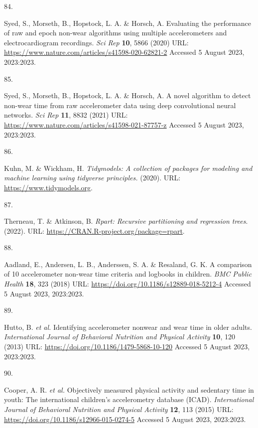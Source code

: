 \documentclass[
  9pt,
]{scrbook}
\newlength{\cslhangindent}
\newlength{\csllabelwidth}
\newlength{\cslentryspacingunit} %
\newenvironment{CSLReferences}[2] %
 {%
  \setlength{\parindent}{0pt}
  \ifodd #1
  \let\oldpar\par
  \def\par{\hangindent=\cslhangindent\oldpar}
  \fi
  \setlength{\parskip}{#2\cslentryspacingunit}
 }%
 {}
\newcommand{\CSLLeftMargin}[1]{\parbox[t]{\csllabelwidth}{#1}}
\newcommand{\CSLRightInline}[1]{\parbox[t]{\linewidth - \csllabelwidth}{#1}\break}
\begin{document}
\begin{CSLReferences}{0}{0}
\leavevmode{}%
\CSLLeftMargin{84. }%
\CSLRightInline{Syed, S., Morseth, B., Hopstock, L. A. \& Horsch, A.
Evaluating the performance of raw and epoch non-wear algorithms using
multiple accelerometers and electrocardiogram recordings. \emph{Sci Rep}
\textbf{10}, 5866 (2020) URL:
\url{https://www.nature.com/articles/s41598-020-62821-2} Accessed 5
August 2023, 2023:2023.}

\leavevmode{}%
\CSLLeftMargin{85. }%
\CSLRightInline{Syed, S., Morseth, B., Hopstock, L. A. \& Horsch, A. A
novel algorithm to detect non-wear time from raw accelerometer data
using deep convolutional neural networks. \emph{Sci Rep} \textbf{11},
8832 (2021) URL:
\url{https://www.nature.com/articles/s41598-021-87757-z} Accessed 5
August 2023, 2023:2023.}

\leavevmode{}%
\CSLLeftMargin{86. }%
\CSLRightInline{Kuhn, M. \& Wickham, H. \emph{Tidymodels: A collection
of packages for modeling and machine learning using tidyverse
principles.} (2020). URL: \url{https://www.tidymodels.org}.}

\leavevmode{}%
\CSLLeftMargin{87. }%
\CSLRightInline{Therneau, T. \& Atkinson, B. \emph{Rpart: Recursive
partitioning and regression trees}. (2022). URL:
\url{https://CRAN.R-project.org/package=rpart}.}

\leavevmode{}%
\CSLLeftMargin{88. }%
\CSLRightInline{Aadland, E., Andersen, L. B., Anderssen, S. A. \&
Resaland, G. K. A comparison of 10 accelerometer non-wear time criteria
and logbooks in children. \emph{{BMC} Public Health} \textbf{18}, 323
(2018) URL: \url{https://doi.org/10.1186/s12889-018-5212-4} Accessed 5
August 2023, 2023:2023.}

\leavevmode{}%
\CSLLeftMargin{89. }%
\CSLRightInline{Hutto, B. \emph{et al.} Identifying accelerometer
nonwear and wear time in older adults. \emph{International Journal of
Behavioral Nutrition and Physical Activity} \textbf{10}, 120 (2013) URL:
\url{https://doi.org/10.1186/1479-5868-10-120} Accessed 5 August 2023,
2023:2023.}

\leavevmode{}%
\CSLLeftMargin{90. }%
\CSLRightInline{Cooper, A. R. \emph{et al.} Objectively measured
physical activity and sedentary time in youth: The international
children's accelerometry database ({ICAD}). \emph{International Journal
of Behavioral Nutrition and Physical Activity} \textbf{12}, 113 (2015)
URL: \url{https://doi.org/10.1186/s12966-015-0274-5} Accessed 5 August
2023, 2023:2023.}


\end{CSLReferences}
\end{document}
